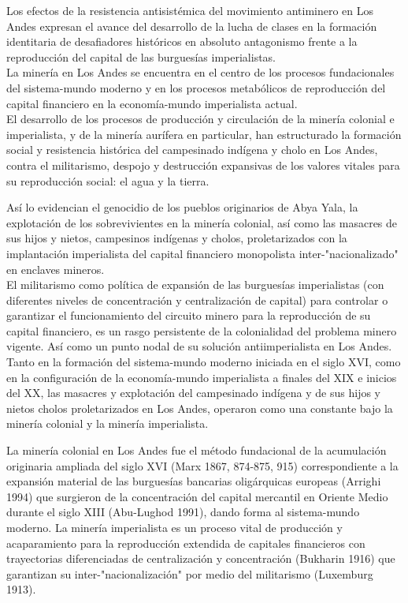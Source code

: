 \documentclass[
]{article}
\begin{document}
Los efectos de la resistencia antisistémica del movimiento antiminero en
Los Andes expresan el avance del desarrollo de la lucha de clases en la
formación identitaria de desafiadores históricos en absoluto antagonismo
frente a la reproducción del capital de las burguesías imperialistas.\\
La minería en Los Andes se encuentra en el centro de los procesos
fundacionales del sistema-mundo moderno y en los procesos metabólicos de
reproducción del capital financiero en la economía-mundo imperialista
actual.\\
El desarrollo de los procesos de producción y circulación de la minería
colonial e imperialista, y de la minería aurífera en particular, han
estructurado la formación social y resistencia histórica del campesinado
indígena y cholo en Los Andes, contra el militarismo, despojo y
destrucción expansivas de los valores vitales para su reproducción
social: el agua y la tierra.

Así lo evidencian el genocidio de los pueblos originarios de Abya Yala,
la explotación de los sobrevivientes en la minería colonial, así como
las masacres de sus hijos y nietos, campesinos indígenas y cholos,
proletarizados con la implantación imperialista del capital financiero
monopolista inter-"nacionalizado" en enclaves mineros.\\
El militarismo como política de expansión de las burguesías
imperialistas (con diferentes niveles de concentración y centralización
de capital) para controlar o garantizar el funcionamiento del circuito
minero para la reproducción de su capital financiero, es un rasgo
persistente de la colonialidad del problema minero vigente. Así como un
punto nodal de su solución antiimperialista en Los Andes.\\
Tanto en la formación del sistema-mundo moderno iniciada en el siglo
XVI, como en la configuración de la economía-mundo imperialista a
finales del XIX e inicios del XX, las masacres y explotación del
campesinado indígena y de sus hijos y nietos cholos proletarizados en
Los Andes, operaron como una constante bajo la minería colonial y la
minería imperialista.

La minería colonial en Los Andes fue el método fundacional de la
acumulación originaria ampliada del siglo XVI (Marx 1867, 874-875, 915)
correspondiente a la expansión material de las burguesías bancarias
oligárquicas europeas (Arrighi 1994) que surgieron de la concentración
del capital mercantil en Oriente Medio durante el siglo XIII (Abu-Lughod
1991), dando forma al sistema-mundo moderno. La minería imperialista es
un proceso vital de producción y acaparamiento para la reproducción
extendida de capitales financieros con trayectorias diferenciadas de
centralización y concentración (Bukharin 1916) que garantizan su
inter-"nacionalización" por medio del militarismo (Luxemburg 1913).
\end{document}
